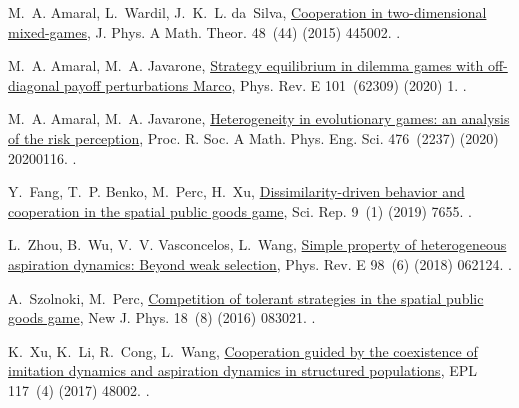 \documentclass[5p]{elsarticle}
\begin{document}
\begin{thebibliography}{10}
M.~A. Amaral, L.~Wardil, J.~K.~L. da~Silva,
  \href{http://stacks.iop.org/1751-8121/48/i=44/a=445002?key=crossref.5d12abaa9d93d27016b1adbf9be62761}{{Cooperation
  in two-dimensional mixed-games}}, J. Phys. A Math. Theor. 48~(44) (2015)
  445002.
\newblock \href {https://doi.org/10.1088/1751-8113/48/44/445002}
  {}.

M.~A. Amaral, M.~A. Javarone,
  \href{https://doi.org/10.1103/PhysRevE.101.062309}{{Strategy equilibrium in
  dilemma games with off-diagonal payoff perturbations Marco}}, Phys. Rev. E
  101~(62309) (2020) 1.
\newblock \href {https://doi.org/10.1103/PhysRevE.101.062309}
  {}.

M.~A. Amaral, M.~A. Javarone, \href{  https://royalsocietypublishing.org/doi/10.1098/rspa.2020.0116}{{Heterogeneity
  in evolutionary games: an analysis of the risk perception}}, Proc. R. Soc. A
  Math. Phys. Eng. Sci. 476~(2237) (2020) 20200116.
  \href {https://doi.org/10.1098/rspa.2020.0116}
  {}.


Y.~Fang, T.~P. Benko, M.~Perc, H.~Xu,
  \href{http://www.nature.com/articles/s41598-019-44184-5}{{Dissimilarity-driven
  behavior and cooperation in the spatial public goods game}}, Sci. Rep. 9~(1)
  (2019) 7655.
\newblock \href {https://doi.org/10.1038/s41598-019-44184-5}
  {}.

L.~Zhou, B.~Wu, V.~V. Vasconcelos, L.~Wang,
  \href{https://link.aps.org/doi/10.1103/PhysRevE.98.062124}{{Simple property of
  heterogeneous aspiration dynamics: Beyond weak selection}}, Phys. Rev. E
  98~(6) (2018) 062124.
  \href {https://doi.org/10.1103/PhysRevE.98.062124}
  {}.

A.~Szolnoki, M.~Perc,
  \href{http://stacks.iop.org/1367-2630/18/i=8/a=083021?key=crossref.d7ebd1a06758011776825fb0e4e69687}{{Competition
  of tolerant strategies in the spatial public goods game}}, New J. Phys.
  18~(8) (2016) 083021.
\newblock \href {https://doi.org/10.1088/1367-2630/18/8/083021}
  {}.

K.~Xu, K.~Li, R.~Cong, L.~Wang,
  \href{http://stacks.iop.org/0295-5075/117/i=4/a=48002?key=crossref.593fe52bc6e6bb80fa41ada34d75d8e2}{{Cooperation
  guided by the coexistence of imitation dynamics and aspiration dynamics in
  structured populations}}, EPL 117~(4) (2017) 48002.
\newblock \href {https://doi.org/10.1209/0295-5075/117/48002}
  {}.


\end{thebibliography}
\end{document}
